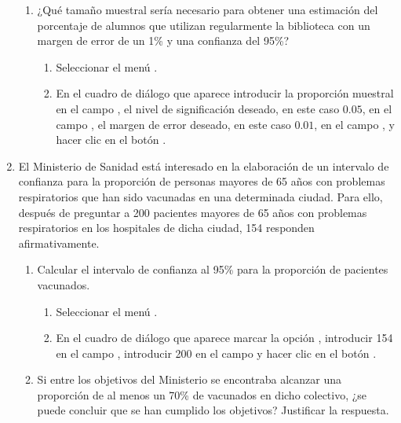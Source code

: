 \begin{enumerate}[leftmargin=*]
\begin{enumerate}
\item ¿Qué tamaño muestral sería necesario para obtener una estimación del porcentaje de alumnos que utilizan regularmente la biblioteca 
con un margen de error de un 1\% y una confianza del 95\%? 
\begin{indicacion}{
\begin{enumerate}
\item Seleccionar el menú .
\item En el cuadro de diálogo que aparece introducir la proporción muestral en el campo , el nivel de significación deseado, en este caso $0.05$, en el campo , el margen de error deseado, en este caso $0.01$, en el campo , y
hacer clic en el botón .
\end{enumerate}
}
\end{indicacion}
\end{enumerate}


\item El Ministerio de Sanidad está interesado en la elaboración de un intervalo de confianza para la proporción de
personas mayores de 65 años con problemas respiratorios que han sido vacunadas en una determinada ciudad. Para ello,
después de preguntar a 200 pacientes mayores de 65 años con problemas respiratorios en los hospitales de dicha ciudad,
154 responden afirmativamente.
\begin{enumerate}
\item Calcular el intervalo de confianza al 95\% para la proporción de pacientes vacunados.
\begin{indicacion}{
\begin{enumerate}
\item Seleccionar el menú .
\item En el cuadro de diálogo que aparece marcar la opción , introducir 154 en el campo , introducir 200 en el campo  y hacer clic en el botón .
\end{enumerate}}
\end{indicacion}

\item Si entre los objetivos del Ministerio se encontraba alcanzar una proporción de al menos un 70\% de vacunados en
dicho colectivo, ¿se puede concluir que se han cumplido los objetivos? Justificar la respuesta.
\end{enumerate}
\end{enumerate}


